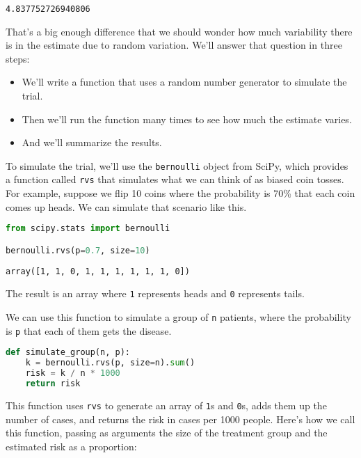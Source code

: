 \begin{lstlisting}[style=output]
4.837752726940806
\end{lstlisting}

That's a big enough difference that we should wonder how much
variability there is in the estimate due to random variation. We'll
answer that question in three steps:

\begin{itemize}
\item
  We'll write a function that uses a random number generator to simulate
  the trial.
\item
  Then we'll run the function many times to see how much the estimate
  varies.
\item
  And we'll summarize the results.
\end{itemize}

To simulate the trial, we'll use the \passthrough{\lstinline!bernoulli!}
object from SciPy, which provides a function called
\passthrough{\lstinline!rvs!} that simulates what we can think of as
biased coin tosses. For example, suppose we flip 10 coins where the
probability is 70\% that each coin comes up heads. We can simulate that
scenario like this.

\begin{lstlisting}[language=Python,style=source]
from scipy.stats import bernoulli

bernoulli.rvs(p=0.7, size=10)
\end{lstlisting}

\begin{lstlisting}[style=output]
array([1, 1, 0, 1, 1, 1, 1, 1, 1, 0])
\end{lstlisting}

The result is an array where \passthrough{\lstinline!1!} represents
heads and \passthrough{\lstinline!0!} represents tails.

We can use this function to simulate a group of
\passthrough{\lstinline!n!} patients, where the probability is
\passthrough{\lstinline!p!} that each of them gets the disease.

\begin{lstlisting}[language=Python,style=source]
def simulate_group(n, p):
    k = bernoulli.rvs(p, size=n).sum()
    risk = k / n * 1000
    return risk
\end{lstlisting}

This function uses \passthrough{\lstinline!rvs!} to generate an array of
\passthrough{\lstinline!1!}s and \passthrough{\lstinline!0!}s, adds them
up the number of cases, and returns the risk in cases per 1000 people.
Here's how we call this function, passing as arguments the size of the
treatment group and the estimated risk as a proportion:

